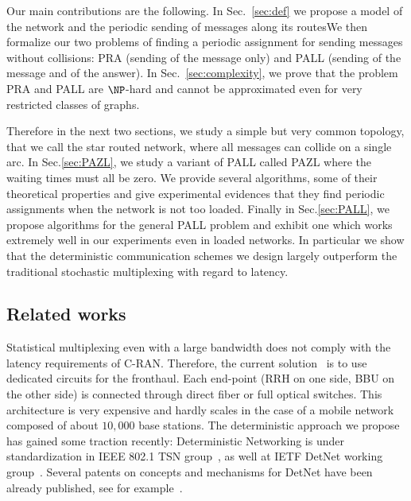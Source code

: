 \documentclass[10pt, conference, letterpaper]{IEEEtran}
\providecommand{\DIFaddtex}[1]{{\protect\color{blue}\uwave{#1}}} %
\providecommand{\DIFaddbegin}{} %
\providecommand{\DIFaddend}{} %
\providecommand{\DIFdelbegin}{} %
\providecommand{\DIFdelend}{} %
\providecommand{\DIFadd}[1]{\texorpdfstring{\DIFaddtex{#1}}{#1}} %
\newcommand{\DIFscaledelfig}{0.5}
\newlength{\DIFdelgraphicswidth} %
\newlength{\DIFdelgraphicsheight} %
\newcommand{\DIFaddincludegraphics}[2][]{{\color{blue}\fbox{\DIFOincludegraphics[#1]{#2}}}} %
\newcommand{\DIFdelincludegraphics}[2][]{%
\sbox{\DIFdelgraphicsbox}{\DIFOincludegraphics[#1]{#2}}%
\settoboxwidth{\DIFdelgraphicswidth}{\DIFdelgraphicsbox} %
\settoboxtotalheight{\DIFdelgraphicsheight}{\DIFdelgraphicsbox} %
\scalebox{\DIFscaledelfig}{%
\parbox[b]{\DIFdelgraphicswidth}{\usebox{\DIFdelgraphicsbox}\\[-\baselineskip] \rule{\DIFdelgraphicswidth}{0em}}\llap{\resizebox{\DIFdelgraphicswidth}{\DIFdelgraphicsheight}{%
\setlength{\unitlength}{\DIFdelgraphicswidth}%
\begin{picture}(1,1)%
\thicklines\linethickness{2pt} %
{\color[rgb]{1,0,0}\put(0,0){\framebox(1,1){}}}%
{\color[rgb]{1,0,0}\put(0,0){\line( 1,1){1}}}%
{\color[rgb]{1,0,0}\put(0,1){\line(1,-1){1}}}%
\end{picture}%
}\hspace*{3pt}}} %
} %
\DeclareRobustCommand{\DIFaddbegin}{\DIFOaddbegin \let\includegraphics\DIFaddincludegraphics} %
\DeclareRobustCommand{\DIFaddend}{\DIFOaddend \let\includegraphics\DIFOincludegraphics} %
\DeclareRobustCommand{\DIFdelbegin}{\DIFOdelbegin \let\includegraphics\DIFdelincludegraphics} %
\DeclareRobustCommand{\DIFdelend}{\DIFOaddend \let\includegraphics\DIFOincludegraphics} %
\begin{document}
Our main contributions are the following.
 In Sec.~\ref{sec:def} we propose a model of the network and the periodic sending of messages along its routes\DIFaddbegin \DIFadd{.
 }\DIFaddend We then formalize our two problems of finding a periodic assignment for sending messages without collisions: PRA (sending of the message only) and PALL (sending of the message and of the answer).  
In Sec.~\ref{sec:complexity}, we prove that the problem PRA and PALL are $\NP$-hard and cannot be approximated even for very
restricted classes of graphs. 
\DIFaddbegin 

\DIFaddend Therefore in the next two sections, we study a simple but very common topology, that we call the
star routed network, where all messages can collide on a single arc.
In Sec.\ref{sec:PAZL}, we study a variant of PALL called PAZL  where the waiting times must all be zero. We provide several algorithms, some of their theoretical properties and give experimental evidences that they find periodic assignments when the network is not too loaded. Finally in Sec.\ref{sec:PALL}, we propose algorithms for the general PALL problem and exhibit one which works extremely well in our experiments even in loaded networks. In particular we show that the deterministic communication schemes we design largely outperform the traditional stochastic multiplexing with regard to latency. 
 \DIFdelbegin %

\DIFdelend \subsection*{Related works}

 Statistical multiplexing even with a large bandwidth does not comply with the latency requirements of C-RAN. Therefore, the current solution~\cite{pizzinat2015things,tayq2017real} is to use dedicated circuits for the fronthaul. Each end-point (RRH on one side, BBU on the other side) is connected through direct fiber or full optical switches. This architecture is very expensive and hardly scales in the case of a mobile network composed of about $10,000$ base stations. The deterministic approach we propose has gained some traction recently: Deterministic Networking is under standardization in IEEE 802.1 TSN group~\cite{finn-detnet-architecture-08}, as well at IETF DetNet working group~\cite{ieee802}. Several patents on concepts and mechanisms for DetNet have been already published, see for example~\cite{howe2005time,leclerc2016transmission}. 
\end{document}
